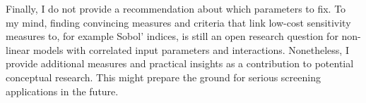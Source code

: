 \noindent
Finally, I do not provide a recommendation about which parameters to fix. To my mind, finding convincing measures and criteria that link low-cost sensitivity measures to, for example Sobol' indices, is still an open research question for non-linear models with correlated input parameters and interactions. Nonetheless, I provide additional measures and practical insights as a contribution to potential conceptual research. This might prepare the ground for serious screening applications in the future.




